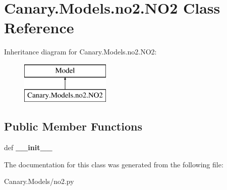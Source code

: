 \hypertarget{class_canary_8_models_1_1no2_1_1_n_o2}{\section{Canary.\-Models.\-no2.\-N\-O2 Class Reference}
\label{class_canary_8_models_1_1no2_1_1_n_o2}
}
Inheritance diagram for Canary.\-Models.\-no2.\-N\-O2\-:\begin{figure}[H]
\begin{center}
\leavevmode
\includegraphics[height=2.000000cm]{class_canary_8_models_1_1no2_1_1_n_o2}
\end{center}
\end{figure}
\subsection*{Public Member Functions}
\begin{DoxyCompactItemize}
\item 
\hypertarget{class_canary_8_models_1_1no2_1_1_n_o2_aa763a9d9e0fffbdd27ebec9ee276cf65}{def {\bfseries \-\_\-\-\_\-init\-\_\-\-\_\-}}\label{class_canary_8_models_1_1no2_1_1_n_o2_aa763a9d9e0fffbdd27ebec9ee276cf65}

\end{DoxyCompactItemize}


The documentation for this class was generated from the following file\-:\begin{DoxyCompactItemize}
\item 
Canary.\-Models/no2.\-py\end{DoxyCompactItemize}
